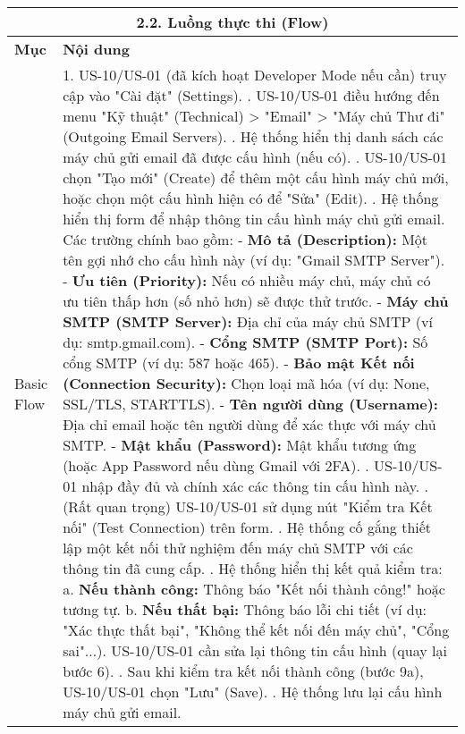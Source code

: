 \begin{longtable}{|m{4cm}|p{11cm}|}
\hline
\multicolumn{2}{|c|}{\textbf{2.2. Luồng thực thi (Flow)}} \\
\hline
\textbf{Mục} & \textbf{Nội dung} \\
\hline
Basic Flow & 1. US-10/US-01 (đã kích hoạt Developer Mode nếu cần) truy cập vào "Cài đặt" (Settings). \newline 2. US-10/US-01 điều hướng đến menu "Kỹ thuật" (Technical) > "Email" > "Máy chủ Thư đi" (Outgoing Email Servers). \newline 3. Hệ thống hiển thị danh sách các máy chủ gửi email đã được cấu hình (nếu có). \newline 4. US-10/US-01 chọn "Tạo mới" (Create) để thêm một cấu hình máy chủ mới, hoặc chọn một cấu hình hiện có để "Sửa" (Edit). \newline 5. Hệ thống hiển thị form để nhập thông tin cấu hình máy chủ gửi email. Các trường chính bao gồm: \newline    - \textbf{Mô tả (Description):} Một tên gợi nhớ cho cấu hình này (ví dụ: "Gmail SMTP Server"). \newline    - \textbf{Ưu tiên (Priority):} Nếu có nhiều máy chủ, máy chủ có ưu tiên thấp hơn (số nhỏ hơn) sẽ được thử trước. \newline    - \textbf{Máy chủ SMTP (SMTP Server):} Địa chỉ của máy chủ SMTP (ví dụ: smtp.gmail.com). \newline    - \textbf{Cổng SMTP (SMTP Port):} Số cổng SMTP (ví dụ: 587 hoặc 465). \newline    - \textbf{Bảo mật Kết nối (Connection Security):} Chọn loại mã hóa (ví dụ: None, SSL/TLS, STARTTLS). \newline    - \textbf{Tên người dùng (Username):} Địa chỉ email hoặc tên người dùng để xác thực với máy chủ SMTP. \newline    - \textbf{Mật khẩu (Password):} Mật khẩu tương ứng (hoặc App Password nếu dùng Gmail với 2FA). \newline 6. US-10/US-01 nhập đầy đủ và chính xác các thông tin cấu hình này. \newline 7. (Rất quan trọng) US-10/US-01 sử dụng nút "Kiểm tra Kết nối" (Test Connection) trên form. \newline 8. Hệ thống cố gắng thiết lập một kết nối thử nghiệm đến máy chủ SMTP với các thông tin đã cung cấp. \newline 9. Hệ thống hiển thị kết quả kiểm tra: \newline    a. \textbf{Nếu thành công:} Thông báo "Kết nối thành công!" hoặc tương tự. \newline    b. \textbf{Nếu thất bại:} Thông báo lỗi chi tiết (ví dụ: "Xác thực thất bại", "Không thể kết nối đến máy chủ", "Cổng sai"...). US-10/US-01 cần sửa lại thông tin cấu hình (quay lại bước 6). \newline 10. Sau khi kiểm tra kết nối thành công (bước 9a), US-10/US-01 chọn "Lưu" (Save). \newline 11. Hệ thống lưu lại cấu hình máy chủ gửi email. \\

\end{longtable}

